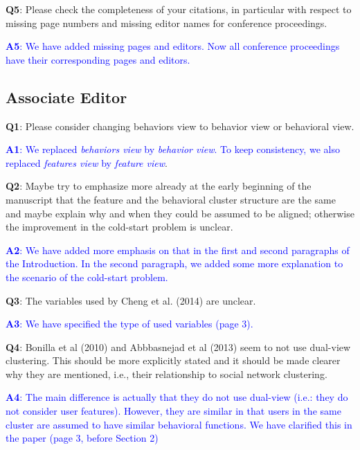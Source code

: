 \documentclass[]{article}
\begin{document}
	\vspace{3mm}	

\textbf{Q5}: Please check the completeness of your citations, in particular with respect to missing page numbers and missing editor names for conference proceedings.
		
		\textcolor{blue}{  \textbf{A5}: We have added missing pages and editors. Now all conference proceedings have their corresponding pages and editors.} 
	

	\vspace{3mm}
	
	
	\subsection*{Associate Editor}
	\textbf{Q1}: Please consider changing behaviors view to behavior view or behavioral view.
	
		\textcolor{blue}{  \textbf{A1}: We replaced \textit{behaviors view} by \textit{behavior view}. To keep consistency, we also replaced  \textit{features view} by \textit{feature view}}. 

	
	\vspace{3mm}
	\textbf{Q2}: Maybe try to emphasize more already at the early beginning of the manuscript that the feature and the behavioral cluster structure are the same and maybe explain why and when they could be assumed to be aligned; otherwise the improvement in the cold-start problem is unclear.

	\textcolor{blue}{  
	\textbf{A2}: We have added more emphasis on that in the first and second paragraphs of the Introduction. In the second paragraph, we added some more explanation to the scenario of the cold-start problem. 
	} 

	\vspace{3mm}
	\textbf{Q3}: The variables used by Cheng et al. (2014) are unclear.

	\textcolor{blue}{  
	\textbf{A3}: We have specified the type of used variables (page 3).
	} 
	
		
	\vspace{3mm}
	\textbf{Q4}: Bonilla et al (2010) and Abbbasnejad et al (2013) seem to not use dual-view clustering. This should be more explicitly stated and it should be made clearer why they are mentioned, i.e., their relationship to social network clustering.
	
	\textcolor{blue}{  
	\textbf{A4}:  The main difference is actually that they do not use dual-view (i.e.: they do not consider user features). However, they are similar in that users in the same cluster are assumed to have similar behavioral functions. We have clarified this in the paper (page 3, before Section 2)
	} 
	
\end{document}
